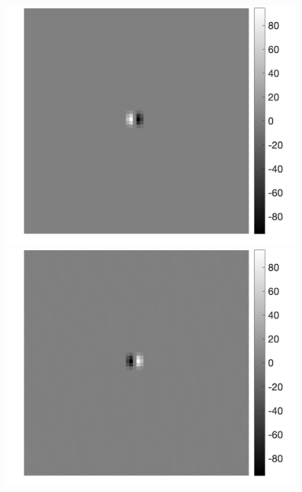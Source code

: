 \documentclass[fleqn,a4paper,oneside,openany]{book}
\begin{document}
\begin{figure}[!t] 
\centering
   \begin{minipage}[b]{0.45\textwidth} 
     \centering
     \includegraphics[trim = 0 0 0 0, clip,scale=0.40]{example_3a1_outlier.png}
   \end{minipage}
   \begin{minipage}[b]{0.45\textwidth}
     \centering
     \includegraphics[trim = 0 0 0 0, clip, scale=0.40]{example_3a1_crm.png}

\end{minipage}
\end{figure}
\end{document}
